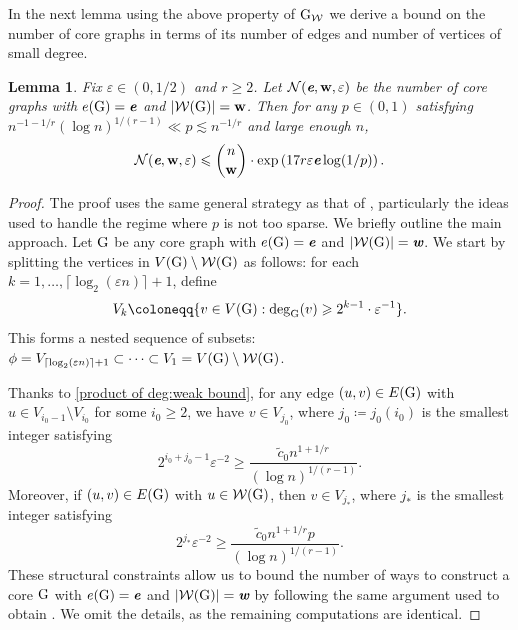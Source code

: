 \documentclass[a4paper,11pt,english,reqno]{amsart}
\numberwithin{equation}{section}
\renewcommand{\leq}{\leqslant}
\renewcommand{\geq}{\geqslant}
\newcommand{\W}{\mathcal{W}}
\newcommand{\tu}[1]{\textup{#1}}
\def\mathbi#1{\textbf{\em #1}}
\newtheorem{lemma}[theorem]{Lemma}
\begin{document}
			
			In the next lemma using the above property of $\tu{G}_{\W}$ we derive a bound on the number of core graphs in terms of its number of edges and number of vertices of small degree.
			\begin{lemma}
				\label{counting cores}
				Fix $\varepsilon\in (0,1/2)$ and $r\geq 2$. %
				Let $\mathcal{N}(\mathbi{e}, \textbf{w}, \varepsilon)$ be the number of core graphs with $e(\tu{G})=\mathbi{e}$ and $|\W(\tu{G})|=\textbf{w}$. Then for any $p\in (0,1)$ satisfying $n^{-1-1/r}(\log n)^{1/(r-1)}\ll p\lesssim n^{-1/r}$ and large enough $n$,
				\begin{equation*}
					\mathcal{N}(\mathbi{e}, \textbf{w}, \varepsilon)\leq {n\choose \textbf{w}}\cdot \exp\left(17r\varepsilon \mathbi{e}\log(1/p)\right).
				\end{equation*}
			\end{lemma}
		\begin{proof}
			The proof uses the same general strategy as that of \cite[Lemma~4.7]{ABRB}, particularly the ideas used to handle the regime where $p$ is not too sparse. We briefly outline the main approach. Let $\tu{G}$ be any core graph with $e(\tu{G})=\mathbi{e}$ and $|\W(\tu{G})|=\mathbi{w}$. We start by splitting the vertices in $V(\tu{G})\setminus \W(\tu{G})$ as follows: for each $k=1,\ldots,\lceil\log_{2}(\varepsilon n)\rceil +1$, define 
			\begin{equation*}
				V_{k}\coloneqq \{v\in V(\tu{G}):\deg_{\tu{G}}(v)\geq 2^{k-1}\cdot\varepsilon^{-1}\}.
			\end{equation*} 
		This forms a nested sequence of subsets: $\phi=V_{\lceil \log_{2}(\varepsilon n)\rceil+1}\subset\cdots\subset V_{1}= V(\tu{G})\setminus \W(\tu{G})$. 
		
		Thanks to \eqref{product of deg:weak bound}, for any edge $(u,v)\in E(\tu{G})$ with $u\in V_{i_0-1}\setminus V_{i_0}$ for some $i_0\geq 2$, we have $v\in V_{j_0}$, where $j_{0}\coloneqq j_{0}(i_0)$ is the smallest integer satisfying 
		\[2^{i_0+j_0-1}\varepsilon^{-2}\geq \frac{\widetilde{c}_0 n^{1+1/r}}{(\log n)^{1/(r-1)}}.\]
		Moreover, if $(u,v)\in E(\tu{G})$ with $u\in \W(\tu{G})$, then $v\in V_{j_{*}}$, where $j_{*}$ is the smallest integer satisfying 
		\[2^{j_*}\varepsilon^{-2}\geq \frac{\widetilde{c}_{0}n^{1+1/r}p}{(\log n)^{1/(r-1)}}.\]
		These structural constraints allow us to bound the number of ways to construct a core $\tu{G}$ with $e(\tu{G})= \mathbi{e}$ and $|\W(\tu{G})|=\mathbi{w}$ by following the same argument used to obtain \cite[(4.20)--(4.22)]{ABRB}. We omit the details, as the remaining computations are identical.
		\end{proof}
\end{document}
